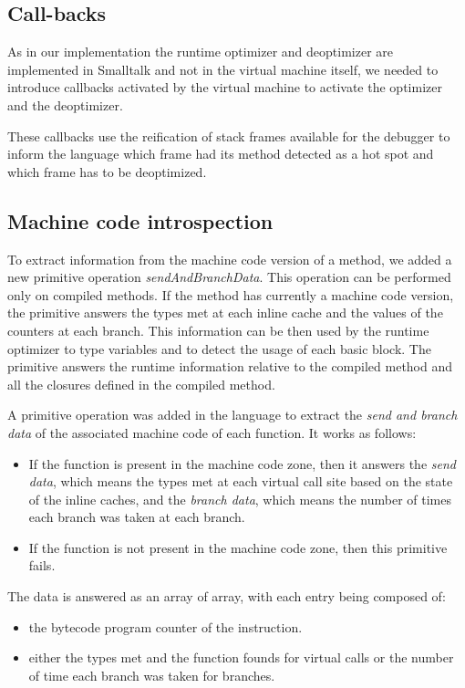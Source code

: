 \documentclass[a4paper,12pt,twoside]{../includes/ThesisStyle}
\begin{document}
\subsection{Call-backs}

As in our implementation the runtime optimizer and deoptimizer are implemented in Smalltalk and not in the virtual machine itself, we needed to introduce callbacks activated by the virtual machine to activate the optimizer and the deoptimizer. 

These callbacks use the reification of stack frames available for the debugger to inform the language which frame had its method detected as a hot spot and which frame has to be deoptimized.


\subsection{Machine code introspection}

To extract information from the machine code version of a method, we added a new primitive operation \emph{sendAndBranchData}. This operation can be performed only on compiled methods. If the method has currently a machine code version, the primitive answers the types met at each inline cache and the values of the counters at each branch. This information can be then used by the runtime optimizer to type variables and to detect the usage of each basic block. The primitive answers the runtime information relative to the compiled method and all the closures defined in the compiled method.


A primitive operation was added in the language to extract the \emph{send and branch data} of the associated machine code of each function. It works as follows:
\begin{itemize}
\item If the function is present in the machine code zone, then it answers the \emph{send data}, which means the types met at each virtual call site based on the state of the inline caches, and the \emph{branch data}, which means the number of times each branch was taken at each branch.
\item If the function is not present in the machine code zone, then this primitive fails.
\end{itemize}

The data is answered as an array of array, with each entry being composed of:
\begin{itemize}
\item the bytecode program counter of the instruction.
\item either the types met and the function founds for virtual calls or the number of time each branch was taken for branches.
\end{itemize}
\end{document}

